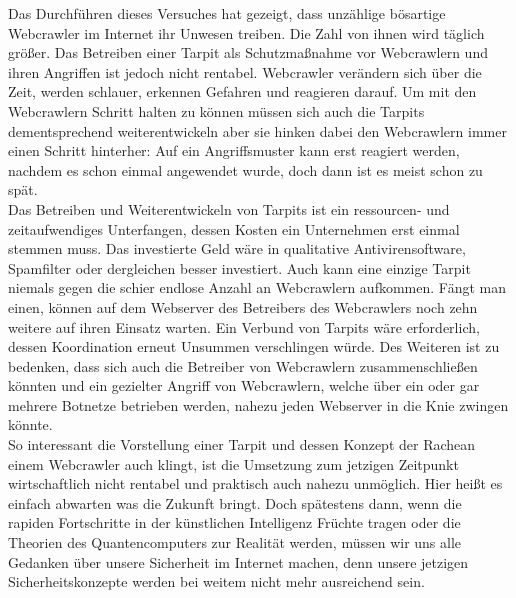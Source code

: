 Das Durchführen dieses Versuches hat gezeigt, dass unzählige bösartige Webcrawler im Internet ihr Unwesen treiben. Die Zahl von ihnen wird täglich größer. Das Betreiben einer Tarpit als Schutzmaßnahme vor Webcrawlern und ihren Angriffen ist jedoch nicht rentabel. Webcrawler verändern sich über die Zeit, werden schlauer, erkennen Gefahren und reagieren darauf. Um mit den Webcrawlern Schritt halten zu können müssen sich auch die Tarpits dementsprechend weiterentwickeln aber sie hinken dabei den Webcrawlern immer einen Schritt hinterher: Auf ein Angriffsmuster kann erst reagiert werden, nachdem es schon einmal angewendet wurde, doch dann ist es meist schon zu spät.\\
Das Betreiben und Weiterentwickeln von Tarpits ist ein ressourcen- und zeitaufwendiges Unterfangen, dessen Kosten ein Unternehmen erst einmal stemmen muss. Das investierte Geld wäre in qualitative Antivirensoftware, Spamfilter oder dergleichen besser investiert. Auch kann eine einzige Tarpit niemals gegen die schier endlose Anzahl an Webcrawlern aufkommen. Fängt man einen, können auf dem Webserver des Betreibers des Webcrawlers noch zehn weitere auf ihren Einsatz warten. Ein Verbund von Tarpits wäre erforderlich, dessen Koordination erneut Unsummen verschlingen würde. Des Weiteren ist zu bedenken, dass sich auch die Betreiber von Webcrawlern zusammenschließen könnten und ein gezielter Angriff von Webcrawlern, welche über ein oder gar mehrere Botnetze betrieben werden, nahezu jeden Webserver in die Knie zwingen könnte.\\
So interessant die Vorstellung einer Tarpit und dessen Konzept der \glqq Rache\grqq\space an einem Webcrawler auch klingt, ist die Umsetzung zum jetzigen Zeitpunkt wirtschaftlich nicht rentabel und praktisch auch nahezu unmöglich. Hier heißt es einfach abwarten was die Zukunft bringt. Doch spätestens dann, wenn die rapiden Fortschritte in der künstlichen Intelligenz Früchte tragen oder die Theorien des Quantencomputers zur Realität werden, müssen wir uns alle Gedanken über unsere Sicherheit im Internet machen, denn unsere jetzigen Sicherheitskonzepte werden bei weitem nicht mehr ausreichend sein.